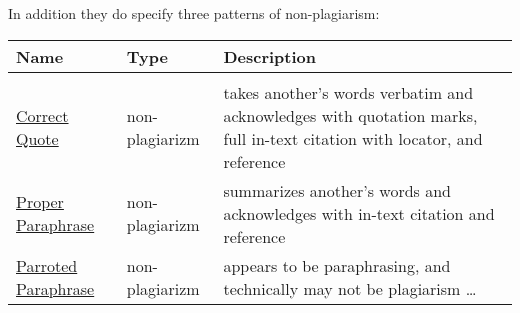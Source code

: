 In addition they do specify  three patterns of
non-plagiarism:

\begin{tabular}{p{2cm}p{4cm}p{8cm}}
Name & Type & Description \\
\toprule
\\
  \href{patternCorrectQuote.html}{Correct Quote} &  non-plagiarizm & takes another's words
  verbatim and acknowledges with quotation marks, full in-text citation
  with locator, and reference
\\
  \href{patternProperParaphrase.html}{Proper Paraphrase} &  non-plagiarizm & summarizes
  another's words and acknowledges with in-text citation and reference
\\
  \href{patternMindlessParaphrase.html}{Parroted Paraphrase} &  non-plagiarizm & appears to
  be paraphrasing, and technically may not be plagiarism \ldots{}
\end{tabular}
